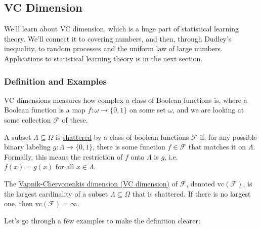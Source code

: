 \subsection{VC Dimension}
We'll learn about VC dimension, which is a huge part of statistical learning theory. We'll connect it to 
covering numbers, and then, through Dudley's inequality, to random processes and the uniform law of large 
numbers. Applications to statistical learning theory is in the next section.

\subsubsection{Definition and Examples}
VC dimensions measures how complex a class of Boolean functions is, where a Boolean function is a map 
$f: \omega \to \{0, 1\}$ on some set $\omega$, and we are looking at some collection $\mathcal{F}$ of these.

\begin{definition}[]
\label{def:8.3.1}
A subset $\Lambda \subseteq \Omega$ is \underline{shattered} by a class of boolean functions $\mathcal{F}$ if, 
for any possible binary labeling $g: \Lambda \to \{0, 1\}$, there is some function $f \in \mathcal{F}$ that 
matches it on $\Lambda$. Formally, this means the restriction of $f$ onto $\Lambda$ is $g$, i.e. 
$f(x) = g(x) \text{ for all } x \in \Lambda$.

The \underline{Vapnik-Chervonenkis dimension (VC dimension)} of $\mathcal{F}$, denoted 
$\mathrm{vc}(\mathcal{F})$, is the largest cardinality of a subset $\Lambda \subseteq \Omega$ that is shattered. 
If there is no largest one, then $\mathrm{vc}(\mathcal{F}) = \infty$.
\end{definition}

Let's go through a few examples to make the definition clearer:

